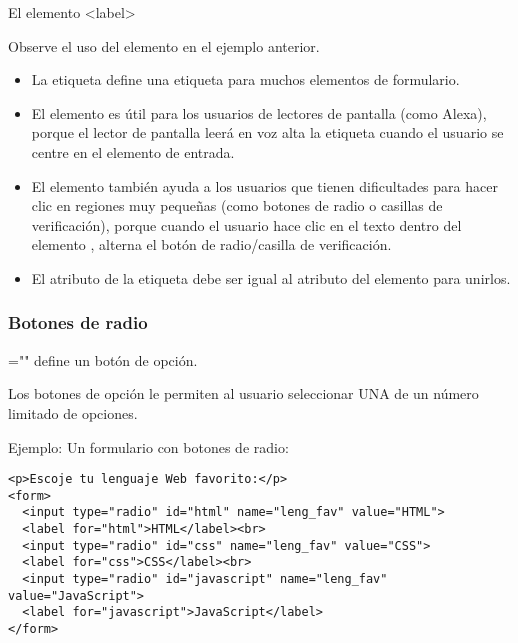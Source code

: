 \begin{frame}[c]{El elemento <label>}

  Observe el uso del elemento  en el ejemplo anterior.

  \begin{itemize}
    \item La etiqueta  define una etiqueta para muchos
      elementos de formulario.
    \item El elemento  es útil para los usuarios de lectores
      de pantalla (como Alexa), porque el lector de pantalla leerá en voz
      alta la etiqueta cuando el usuario se centre en el elemento de
      entrada.
    \item El elemento  también ayuda a los usuarios que tienen
      dificultades para hacer clic en regiones muy pequeñas (como botones
      de radio o casillas de verificación), porque cuando el usuario hace
      clic en el texto dentro del elemento , alterna el botón
      de radio/casilla de verificación.
    \item El atributo  de la etiqueta  debe ser igual
      al atributo  del elemento  para unirlos.
  \end{itemize}
\end{frame}

\begin{frame}[fragile]
  \frametitle{Botones de radio}

   =""\eti{>}
  define un botón de opción.

  \vspace{\baselineskip}
  Los botones de opción le permiten al usuario seleccionar UNA de un
  número limitado de opciones.

  \vspace{\baselineskip}
  Ejemplo: Un formulario con botones de radio:
  \begin{lstlisting}
<p>Escoje tu lenguaje Web favorito:</p>
<form>
  <input type="radio" id="html" name="leng_fav" value="HTML">
  <label for="html">HTML</label><br>
  <input type="radio" id="css" name="leng_fav" value="CSS">
  <label for="css">CSS</label><br>
  <input type="radio" id="javascript" name="leng_fav" value="JavaScript">
  <label for="javascript">JavaScript</label>
</form>
  \end{lstlisting}
\end{frame}

\begin{frame}[fragile]
  \frametitle{}

  \vspace{\baselineskip}
  \begin{lstlisting}
  \end{lstlisting}
\end{frame}

